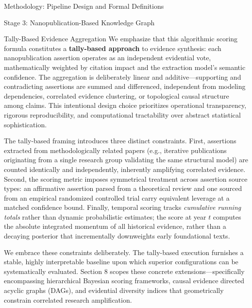 \documentclass[
  ignorenonframetext,
]{beamer}
\begin{document}
\begin{frame}[fragile]{Methodology: Pipeline Design and Formal
Definitions}
\begin{block}{Stage 3: Nanopublication-Based Knowledge Graph}
\begin{block}{Tally-Based Evidence Aggregation}
\protect{}\label{tally-based-evidence-aggregation}
We emphasize that this algorithmic scoring formula constitutes a
\textbf{tally-based approach} to evidence synthesis: each
nanopublication assertion operates as an independent evidential vote,
mathematically weighted by citation impact and the extraction model's
semantic confidence. The aggregation is deliberately linear and
additive---supporting and contradicting assertions are summed and
differenced, independent from modeling dependencies, correlated evidence
clustering, or topological causal structure among claims. This
intentional design choice prioritizes operational transparency, rigorous
reproducibility, and computational tractability over abstract
statistical sophistication.

The tally-based framing introduces three distinct constraints. First,
assertions extracted from methodologically related papers (e.g.,
iterative publications originating from a single research group
validating the same structural model) are counted identically and
independently, inherently amplifying correlated evidence. Second, the
scoring metric imposes symmetrical treatment across assertion source
types: an affirmative assertion parsed from a theoretical review and one
sourced from an empirical randomized controlled trial carry equivalent
leverage at a matched confidence bound. Finally, temporal scoring tracks
\emph{cumulative running totals} rather than dynamic probabilistic
estimates; the score at year \(t\) computes the absolute integrated
momentum of all historical evidence, rather than a decaying posterior
that incrementally downweights early foundational texts.

We embrace these constraints deliberately. The tally-based execution
furnishes a stable, highly interpretable baseline upon which superior
configurations can be systematically evaluated. Section 8 scopes these
concrete extensions---specifically encompassing hierarchical Bayesian
scoring frameworks, causal evidence directed acyclic graphs (DAGs), and
evidential diversity indices that geometrically constrain correlated
research amplification.
\end{block}
\end{block}


\end{frame}
\end{document}
